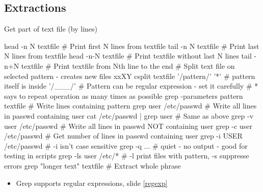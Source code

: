 \documentclass[compress, ucs, xelatex, 11pt, xcolor=svgnames,
  hyperref={
    bookmarks=true,
    unicode=true,
    colorlinks=true,
    pdftitle={Linux, command line and MetaCentrum},
    plainpages=false,
    pdfauthor={Vojtech Zeisek},
    pdfsubject={Course about use of Linux command line, writing shell scripts and using MetaCentrum of CESNET},
    pdfcreator={XeLaTeX},
    pdfkeywords={Linux, GNU, BASH, shell, command line, MetaCentrum},
    linkcolor=DarkRed,
    anchorcolor=DarkBlue,
    citecolor=Indigo,
    filecolor=NavyBlue,
    menucolor=DarkMagenta,
    urlcolor=DarkBlue,
    pdftex},
  url={hyphens, lowtilde} %
  ]{beamer}
\begin{document}
\subsection{Extractions}

\begin{frame}[fragile]{Get part of text file (by lines)}
  \begin{bashcode}
    head -n N textfile # Print first N lines from textfile
    tail -n N textfile # Print last N lines from textfile
    head -n-N textfile # Print textfile without last N lines
    tail -n+N textfile # Print textfile from Nth line to the end
    # Split text file on selected pattern - creates new files xxXY
    csplit textfile '/pattern/' '{*}' # pattern itself is inside '/___/'
    # Pattern can be regular expression - set it carefully
    # {*} says to repeat operation as many times as possible
    grep -parameters pattern textfile # Write lines containing pattern
    grep user /etc/passwd # Write all lines in passwd containing user
    cat /etc/passwd | grep user # Same as above
    grep -v user /etc/passwd # Write all lines in passwd NOT containing user
    grep -c user /etc/passwd # Get number of lines in passwd containing user
    grep -i USER /etc/passwd # -i isn't case sensitive
    grep -q ... # quiet - no output - good for testing in scripts
    grep -ls user /etc/* # -l print files with pattern, -s suppresse errors
    grep "longer text" textfile # Extract whole phrase
  \end{bashcode}
  \begin{itemize}
    \item Grep supports regular expressions, slide \ref{regexp}
  \end{itemize}
\end{frame}
\end{document}
